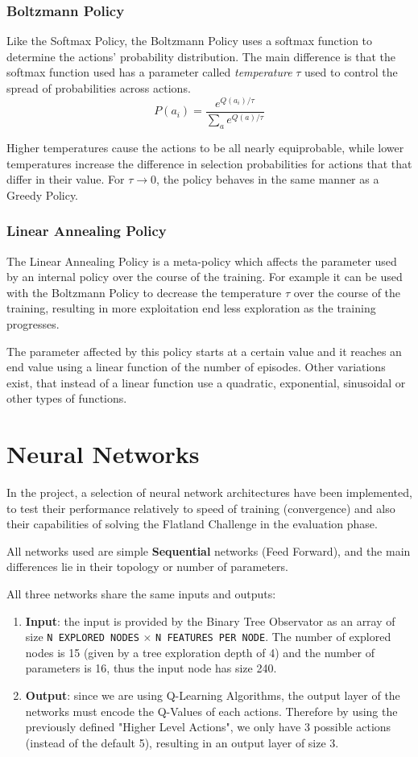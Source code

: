 \documentclass[13pt]{article}
\begin{document}
\subsubsection{Boltzmann Policy}
Like the Softmax Policy, the Boltzmann Policy uses a softmax function to determine the actions' probability distribution. The main difference is that the softmax function used has a parameter called \textit{temperature} $\tau$ used to control the spread of probabilities across actions.
\[ P(a_i) = \frac{e^{Q(a_i) / \tau}}{\sum_a e^{Q(a)/\tau}}\]

Higher temperatures cause the actions to be all nearly equiprobable, while lower temperatures increase the difference in selection probabilities for actions that that differ in their value. For $\tau \to 0$, the policy behaves in the same manner as a Greedy Policy.

\subsubsection{Linear Annealing Policy}
The Linear Annealing Policy is a meta-policy which affects the parameter used by an internal policy over the course of the training. For example it can be used with the Boltzmann Policy to decrease the temperature $\tau$ over the course of the training, resulting in more exploitation end less exploration as the training progresses.

The parameter affected by this policy starts at a certain value and it reaches an end value using a linear function of the number of episodes. Other variations exist, that instead of a linear function use a quadratic, exponential, sinusoidal or other types of functions.
\newpage
%
%

\section{Neural Networks}
In the project, a selection of neural network architectures have been implemented, to test their performance relatively to speed of training (convergence) and also their capabilities of solving the Flatland Challenge in the evaluation phase.

All networks used are simple \textbf{Sequential} networks (Feed Forward), and the main differences lie in their topology or number of parameters.

All three networks share the same inputs and outputs:
\begin{enumerate}
    \item \textbf{Input}: the input is provided by the Binary Tree Observator as an array of size \texttt{N EXPLORED NODES} $\times$ \texttt{N FEATURES PER NODE}. The number of explored nodes is 15 (given by a tree exploration depth of 4) and the number of parameters is 16, thus the input node has size 240.
    \item \textbf{Output}: since we are using Q-Learning Algorithms, the output layer of the networks must encode the Q-Values of each actions. Therefore by using the previously defined "Higher Level Actions", we only have 3 possible actions (instead of the default 5), resulting in an output layer of size 3.
\end{enumerate}
\end{document}
